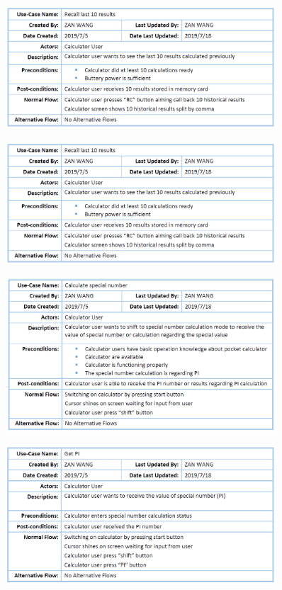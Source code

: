 \begin{figure}[H]
\centering  %
\includegraphics[width=0.9\textwidth]{images/use_case/UC_rl10r.PNG}
\end{figure}

\begin{figure}[H]
\centering  %
\includegraphics[width=0.9\textwidth]{images/use_case/UC_rl10r.PNG}
\end{figure}

\begin{figure}[H]
\centering  %
\includegraphics[width=0.9\textwidth]{images/use_case/UC_csn.PNG}
\end{figure}

\begin{figure}[H]
\centering  %
\includegraphics[width=0.9\textwidth]{images/use_case/UC_get_pi.PNG}
\end{figure}


